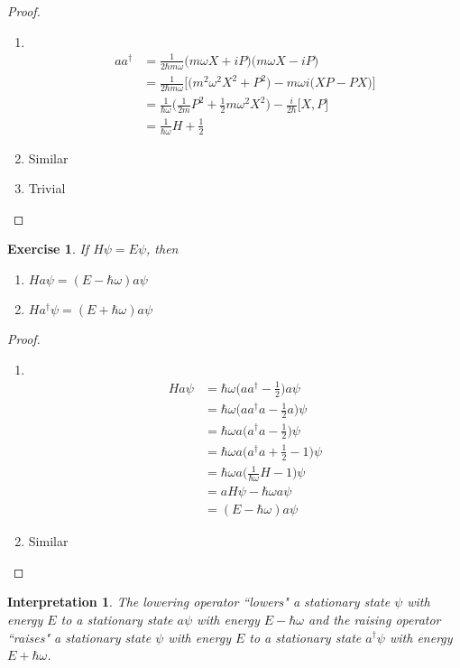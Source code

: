 \documentclass[12pt]{amsart}
\newtheorem{intp}[thm]{Interpretation}
\newtheorem{ex}[thm]{Exercise}
\newcommand{\om}{\omega}
\begin{document}
\begin{proof}
\begin{enumerate}
\item \
\begin{align*}
a a^{\dagger}
&= \frac{1}{2\hbar m \om}\big(m \om X + iP \big) \big( m\om X - iP )\\
&= \frac{1}{2 \hbar m \om} \bigg[ \big(m^2 \om^2 X^2 + P^2 \big) - m\om i\big(XP - PX \big) \bigg]\\
&= \frac{1}{\hbar \om}\big(\frac{1}{2m}P^2 + \frac{1}{2}m \om^2 X^2 \big) - \frac{i}{2 \hbar}\big[X,P \big]\\
&= \frac{1}{\hbar \om}H + \frac{1}{2}
\end{align*}
\item Similar
\item Trivial
\end{enumerate}
\end{proof}

\begin{ex}
If $H\psi = E\psi$, then 
\begin{enumerate}
\item $Ha\psi = (E-\hbar \om) a \psi$
\item $Ha^{\dagger}\psi = (E+\hbar \om) a \psi$
\end{enumerate}
\end{ex}

\begin{proof}\
\begin{enumerate}
\item \
\begin{align*}
Ha\psi 
&= \hbar \om \bigg(aa^{\dagger}-\frac{1}{2}\bigg)a \psi\\
&= \hbar \om \bigg(aa^{\dagger}a-\frac{1}{2}a\bigg) \psi\\
&= \hbar \om a\bigg(a^{\dagger}a-\frac{1}{2}\bigg) \psi\\
&= \hbar \om a\bigg(a^{\dagger}a+\frac{1}{2} -1\bigg) \psi\\
&= \hbar \om a\bigg(\frac{1}{\hbar \om}H -1\bigg) \psi\\
&= a H\psi -\hbar \om a \psi \\
&= (E - \hbar \om)a\psi 
\end{align*}
\item Similar
\end{enumerate}
\end{proof}

\begin{intp}
The lowering operator ``lowers"  a stationary state $\psi$ with energy $E$ to a stationary state $a\psi$ with energy $E-\hbar \om$ and the raising operator ``raises"  a stationary state $\psi$ with energy $E$ to a stationary state $a^{\dagger}\psi$ with energy $E+\hbar \om$.
\end{intp}
\end{document}
